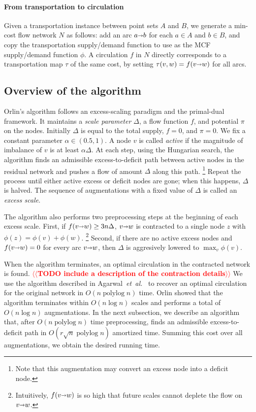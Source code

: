 \documentclass[11pt]{article}
\makeatletter
\def\etal{\emph{et~al.}}
\def\etal{\textit{et~al.}}
\def\polylog{\mathop{\mathrm{polylog}}}
\def\fsupply{\phi}
\def\arcto{\mathord\shortrightarrow}
\def\arc#1#2{#1\arcto#2}
\theoremstyle{plain}
\numberwithin{figure}{section}
\def\EMPH#1{\textcolor{BrickRed}{{\emph{#1}}}}
\def\n@te#1{\textsf{\boldmath \textbf{$\langle\!\langle$#1$\rangle\!\rangle$}}\leavevmode}
\def\note#1{\textcolor{red}{\n@te{#1}}}
\makeatother
\begin{document}
\paragraph*{From transportation to circulation}
Given a transportation instance between point sets $A$ and $B$, we generate a
min-cost flow network $N$ as follows: add an arc $\arc ab$ for each $a \in A$ and $b \in B$,
and copy the transportation supply/demand function to use as the MCF supply/demand function $\fsupply$.
A circulation $f$ in $N$ directly corresponds to a transportation map $\tau$
of the same cost, by setting $\tau(v, w) = f(\arc vw)$ for all arcs.

\subsection{Overview of the algorithm}

Orlin's algorithm follows an excess-scaling paradigm and the primal-dual framework.
It maintains a \EMPH{scale parameter} $\Delta$, a flow function $f$, and
potential $\pi$ on the nodes.
Initially $\Delta$ is equal to the total supply, $f = 0$, and $\pi = 0$.
We fix a constant parameter $\alpha \in (0.5, 1)$.
A node $v$ is called \EMPH{active} if the magnitude of imbalance of $v$ is at least $\alpha\Delta$.
At each step, using the Hungarian search, the algorithm finds an admissible
excess-to-deficit path between active nodes in the residual network and pushes a flow
of amount $\Delta$ along this path.%
\footnote{Note that this augmentation may convert an excess node into a deficit node.}
Repeat the process until either active excess or deficit nodes are gone; when this happens, $\Delta$ is halved.
The sequence of augmentations with a fixed value of $\Delta$ is called an
\EMPH{excess scale}.

The algorithm also performs two preprocessing steps at the beginning of each excess scale.
First, if $f(\arc vw) \geq 3n\Delta$, $\arc vw$ is contracted to a single node $z$ with
$\fsupply(z) = \fsupply(v) + \fsupply(w)$.%
\footnote{Intuitively, $f(\arc vw)$ is so high that future scales cannot deplete
the flow on $\arc vw$.}
Second, if there are no active excess nodes and $f(\arc vw) = 0$ for every arc $\arc vw$, then $\Delta$
is aggresively lowered to $\max_v \fsupply(v)$.

When the algorithm terminates, an optimal circulation in the
contracted network is found.
\note{TODO include a description of the contraction details}
We use the algorithm described in Agarwal~\etal~\cite{AFPVX17arxiv} to recover
an optimal circulation for the original network in $O(n\polylog n)$ time.
Orlin showed that the algorithm terminates within $O(n\log n)$ scales and
performs a total of $O(n\log n)$ augmentations.
In the next subsection, we describe an algorithm that, after $O(n\polylog n)$ time
preprocessing,
finds an admissible excess-to-deficit path
in $O(r\sqrt{n} \polylog n)$ amortized time.
Summing this cost over all augmentations, we obtain the desired running time.
\end{document}
